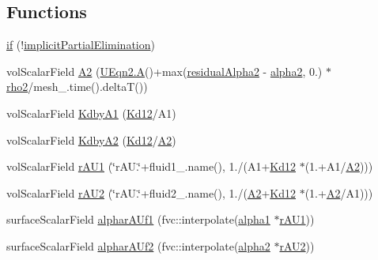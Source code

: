 \subsection*{Functions}
\begin{DoxyCompactItemize}
\item 
\hyperlink{pEqn__2p_8H_a5ae53f39028b227fab81abc22e3286d6}{if} (!\hyperlink{refsAndControls__2p_8H_a1d4f14edd4b410f2e95c2b58e5e49210}{implicit\+Partial\+Elimination})
\item 
vol\+Scalar\+Field \hyperlink{pEqn__2p_8H_adfef74740ec7f70886ed3f74e6dd35f6}{A2} (\hyperlink{solvePointKinetics_8H_af0b39a25157c5a983e067e9f3176f91f}{U\+Eqn2.\+A}()+max(\hyperlink{refsAndControls__2p_8H_a960fdd6ecc9e71702c858667a416d298}{residual\+Alpha2} -\/ \hyperlink{UEqns__2p_8H_abe544d8197b804c4439afde6d860d5d7}{alpha2}, 0.) $\ast$\hyperlink{UEqns__2p_8H_a2a5e0e37e61560baf7b55ce8b70e01c0}{rho2}/mesh\+\_\+.\+time().deltaT())
\item 
vol\+Scalar\+Field \hyperlink{pEqn__2p_8H_a6b7c38ee9390c649d0a54588ccfb6d1b}{Kdby\+A1} (\hyperlink{UEqns__2p_8H_a5bbf0de883575e238683e5a720a8e16e}{Kd12}/A1)
\item 
vol\+Scalar\+Field \hyperlink{pEqn__2p_8H_a3b3d5399abb38ee13b6d3d80644e8bfa}{Kdby\+A2} (\hyperlink{UEqns__2p_8H_a5bbf0de883575e238683e5a720a8e16e}{Kd12}/\hyperlink{pEqn__2p_8H_adfef74740ec7f70886ed3f74e6dd35f6}{A2})
\item 
vol\+Scalar\+Field \hyperlink{pEqn__2p_8H_a69f7869c92c05533e05895da3a3a1ffc}{r\+A\+U1} (\char`\"{}r\+A\+U.\char`\"{}+fluid1\+\_\+.\+name(), 1./(A1+\hyperlink{UEqns__2p_8H_a5bbf0de883575e238683e5a720a8e16e}{Kd12} $\ast$(1.+A1/\hyperlink{pEqn__2p_8H_adfef74740ec7f70886ed3f74e6dd35f6}{A2})))
\item 
vol\+Scalar\+Field \hyperlink{pEqn__2p_8H_a92380f46444d6e0ea5bf66657c37f11b}{r\+A\+U2} (\char`\"{}r\+A\+U.\char`\"{}+fluid2\+\_\+.\+name(), 1./(\hyperlink{pEqn__2p_8H_adfef74740ec7f70886ed3f74e6dd35f6}{A2}+\hyperlink{UEqns__2p_8H_a5bbf0de883575e238683e5a720a8e16e}{Kd12} $\ast$(1.+\hyperlink{pEqn__2p_8H_adfef74740ec7f70886ed3f74e6dd35f6}{A2}/A1)))
\item 
surface\+Scalar\+Field \hyperlink{pEqn__2p_8H_ab2d59b34715585245f2be8e066a2d42d}{alphar\+A\+Uf1} (fvc\+::interpolate(\hyperlink{UEqns__2p_8H_ad67e06bee4c61d3ec617e035493b4722}{alpha1} $\ast$\hyperlink{pEqn__2p_8H_a69f7869c92c05533e05895da3a3a1ffc}{r\+A\+U1}))
\item 
surface\+Scalar\+Field \hyperlink{pEqn__2p_8H_a1610c910a810828f64e67284a1eccf9e}{alphar\+A\+Uf2} (fvc\+::interpolate(\hyperlink{UEqns__2p_8H_abe544d8197b804c4439afde6d860d5d7}{alpha2} $\ast$\hyperlink{pEqn__2p_8H_a92380f46444d6e0ea5bf66657c37f11b}{r\+A\+U2}))

\end{DoxyCompactItemize}
